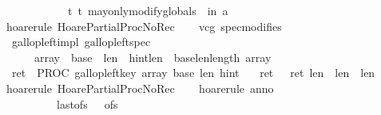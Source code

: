 \begin{isabellebody}
\ \ \ \ \ \ \ \ \ \ \ \ {\isacharbraceleft}t{\isachardot}\ t\ may{\isacharunderscore}only{\isacharunderscore}modify{\isacharunderscore}globals\ {\isasymsigma}\ in\ {\isacharbrackleft}a{\isacharbrackright}{\isacharbraceright}{\isachardoublequoteclose}\isanewline
%
\isadelimproof
\ \ %
\endisadelimproof
%
\isatagproof
{}\isamarkupfalse%
\ {\isacharparenleft}hoare{\isacharunderscore}rule\ HoarePartial{\isachardot}ProcNoRec{}{\isacharparenright}\isanewline
\ \ \isamarkupfalse%
\ {\isacharparenleft}vcg\ spec{\isacharequal}modifies{\isacharparenright}\isanewline
\ \ \isamarkupfalse%
%
\endisatagproof
{\isafoldproof}%
%
\isadelimproof
\isanewline
%
\endisadelimproof
\isanewline
{}\isamarkupfalse%
\ {\isacharparenleft}\ gallop{\isacharunderscore}left{\isacharunderscore}impl{\isacharparenright}\ gallop{\isacharunderscore}left{\isacharunderscore}spec{\isacharcolon}\isanewline
\ \ \isanewline
\ \ {\isachardoublequoteopen}{\isasymforall}{\isasymsigma}{\isachardot}\ {\isasymGamma}{\isasymturnstile}\ {\isasymlbrace}\ {\isasymsigma}{\isachardot}\ {\isasymacute}array{\isasymnoteq}{\isacharbrackleft}{\isacharbrackright}\ {\isasymand}\ {\isasymacute}base{\isasymge}{}\ {\isasymand}\ {\isasymacute}len{\isachargreater}{}\ {\isasymand}\ {\isasymacute}hint{\isacharless}{\isasymacute}len\ {\isasymand}\ {\isasymacute}base{\isacharplus}{\isasymacute}len{\isasymle}length\ {\isasymacute}array{\isasymrbrace}\isanewline
\ \ {\isasymacute}ret\ {\isacharcolon}{\isacharequal}{\isacharequal}\ PROC\ gallop{\isacharunderscore}left{\isacharparenleft}{\isasymacute}key{\isacharcomma}\ {\isasymacute}array{\isacharcomma}\ {\isasymacute}base{\isacharcomma}\ {\isasymacute}len{\isacharcomma}\ {\isasymacute}hint{\isacharparenright}\isanewline
\ \ {\isasymlbrace}\ {\isasymacute}ret\ {\isasymge}{}\ {\isasymand}\ {\isasymacute}ret\ {\isasymle}{\isasymacute}len\ {\isasymand}\ {\isasymacute}len\ {\isacharequal}\ \isactrlbsup {\isasymsigma}\isactrlesup len{\isasymrbrace}{\isachardoublequoteclose}\isanewline
%
\isadelimproof
\ \ %
\endisadelimproof
%
\isatagproof
{}\isamarkupfalse%
\ {\isacharparenleft}hoare{\isacharunderscore}rule\ HoarePartial{\isachardot}ProcNoRec{}{\isacharparenright}\isanewline
\ \ \isamarkupfalse%
\ {\isacharparenleft}hoare{\isacharunderscore}rule\ anno{\isacharequal}{\isachardoublequoteopen}\isanewline
\ \ \ \ \ \ \ \ \ \ {\isasymacute}last{\isacharunderscore}ofs\ {\isacharcolon}{\isacharequal}{\isacharequal}\ {}{\isacharsemicolon}{\isacharsemicolon}\ {\isasymacute}ofs\ {\isacharcolon}{\isacharequal}{\isacharequal}\ {}{\isacharsemicolon}{\isacharsemicolon}\isanewline

\end{isabellebody}
